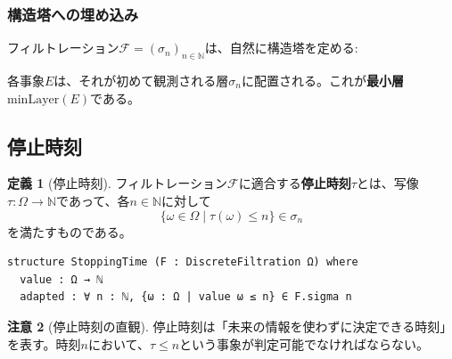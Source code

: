 \documentclass[a4paper,12pt]{ltjsarticle}
\theoremstyle{definition}
\newtheorem{definition}{定義}[section]
\newtheorem{remark}[definition]{注意}
\begin{document}
\subsubsection{構造塔への埋め込み}

フィルトレーション$\mathcal{F} = (\sigma_n)_{n \in \mathbb{N}}$は、自然に構造塔を定める:

\begin{center}
\end{center}

各事象$E$は、それが初めて観測される層$\sigma_n$に配置される。これが\textbf{最小層}$\mathrm{minLayer}(E)$である。

\subsection{停止時刻}

\begin{definition}[停止時刻]
フィルトレーション$\mathcal{F}$に適合する\textbf{停止時刻}$\tau$とは、写像$\tau : \Omega \to \mathbb{N}$であって、各$n \in \mathbb{N}$に対して
\[
  \{\omega \in \Omega \mid \tau(\omega) \leq n\} \in \sigma_n
\]
を満たすものである。
\end{definition}

\begin{leanbox}
\begin{verbatim}
structure StoppingTime (F : DiscreteFiltration Ω) where
  value : Ω → ℕ
  adapted : ∀ n : ℕ, {ω : Ω | value ω ≤ n} ∈ F.sigma n
\end{verbatim}
\end{leanbox}

\begin{remark}[停止時刻の直観]
停止時刻は「未来の情報を使わずに決定できる時刻」を表す。時刻$n$において、$\tau \leq n$という事象が判定可能でなければならない。
\end{remark}
\end{document}
